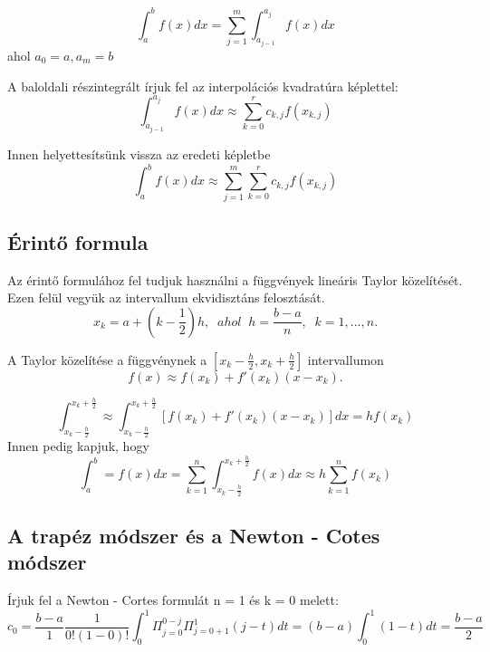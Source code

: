 \documentclass{article}
\theoremstyle{definition}
\theoremstyle{theorem}
\begin{document}
\begin{equation*}
 \int_a^{b} f(x) dx = \sum_{j = 1} ^{m} \int_{a_{j-1}} ^{a_j} f(x) dx
\end{equation*}
 ahol $a_0 = a, a_m =b $

A baloldali részintegrált írjuk fel az interpolációs kvadratúra képlettel:
\begin{equation*}
\int_{a_{j-1}}^{a_j} f(x) dx \approx \sum_{k=0}^{r} c_{k,j}f(x_{k,j})
\end{equation*}

Innen helyettesítsünk vissza az eredeti képletbe
\begin{equation*}
\int_a^b f(x) dx \approx \sum_{j=1}^{m} \sum_{k=0}^{r} c_{k,j} f(x_{k,j})
\end{equation*}


\subsection{Érintő formula}

Az érintő formulához fel tudjuk használni a függvények lineáris Taylor közelítését. Ezen felül vegyük az intervallum ekvidisztáns felosztását.
\begin{equation*}
   x_k = a + (k - \frac{1}{2})h ,\;\; ahol\;\; h = \frac{b-a}{n},\;\; k =1,...,n.
\end{equation*}



A Taylor közelítése a függvénynek a $[x_k-\frac{h}{2},x_k+\frac{h}{2}]$ intervallumon
\begin{equation*}
    f(x) \approx f(x_k)+f'(x_k)(x-x_k).
\end{equation*}

\begin{equation*}
\int_{x_k-\frac{h}{2}}^{x_k + \frac{h}{2}} \approx \int_{x_k - \frac{h}{2}}^{x_k + \frac{h}{2}} [f(x_k) + f'(x_k)(x-x_k)] dx = hf(x_k)
\end{equation*}
\newline
Innen pedig kapjuk, hogy
\begin{equation*}
\int_a^b = f(x) dx = \sum_{k=1}^n \int_{x_k - \frac{h}{2}}^{x_k + \frac{h}{2}} f(x)dx \approx h \sum_{k=1}^n f(x_k)
\end{equation*}



\subsection{A trapéz módszer és a Newton - Cotes módszer}
Írjuk fel a Newton - Cortes formulát n = 1 és k = 0 melett:
\begin{equation*}
c_0 = \frac{b-a}{1} \frac{1}{0!(1-0)!} \int_0^{1} \Pi_{j=0}^{0-j} \Pi_{j=0+1}^{1} (j-t) dt = (b-a) \int_0^1 (1-t) dt = \frac{b-a}{2}
\end{equation*}
\end{document}
